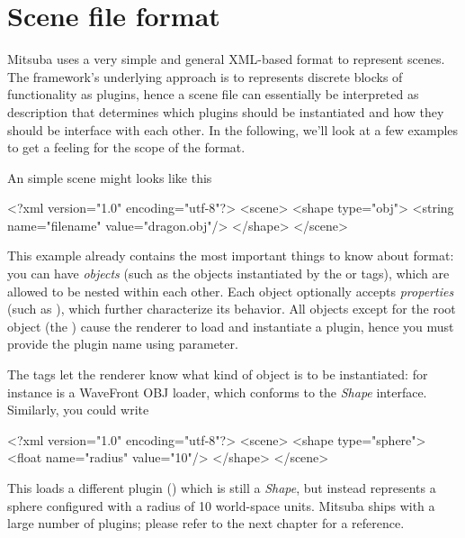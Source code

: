 \section{Scene file format}
Mitsuba uses a very simple and general XML-based format to represent scenes.  
The framework's underlying approach is to represents discrete blocks of functionality as plugins, 
hence a scene file can essentially be interpreted as description that determines which 
plugins should be instantiated and how they should be interface with each other.
In the following, we'll look at a few examples to get a feeling for the scope of the
format.

An simple scene might looks like this
\begin{xml}
<?xml version="1.0" encoding="utf-8"?>
<scene>
	<shape type="obj">
		<string name="filename" value="dragon.obj"/>
	</shape>
</scene>
\end{xml}
This example already contains the most important things to know about format: you can have
\emph{objects} (such as the objects instantiated by the  or  tags), which are allowed to be nested within
each other. Each object optionally accepts \emph{properties} (such as ),
which further characterize its behavior. All objects except for the root object (the )
cause the renderer to load and instantiate a plugin, hence you must provide the plugin name using
 parameter. 

The tags let the renderer know what kind of object is to be instantiated: for instance  is a
WaveFront OBJ loader, which conforms to the \emph{Shape} interface. Similarly,
you could write
\begin{xml}
<?xml version="1.0" encoding="utf-8"?>
<scene>
	<shape type="sphere">
		<float name="radius" value="10"/>
	</shape>
</scene>
\end{xml}
This loads a different plugin () which is still a \emph{Shape}, but instead represents 
a sphere configured with a radius of 10 world-space units. Mitsuba ships with 
a large number of plugins; please refer to the next chapter for a reference.

